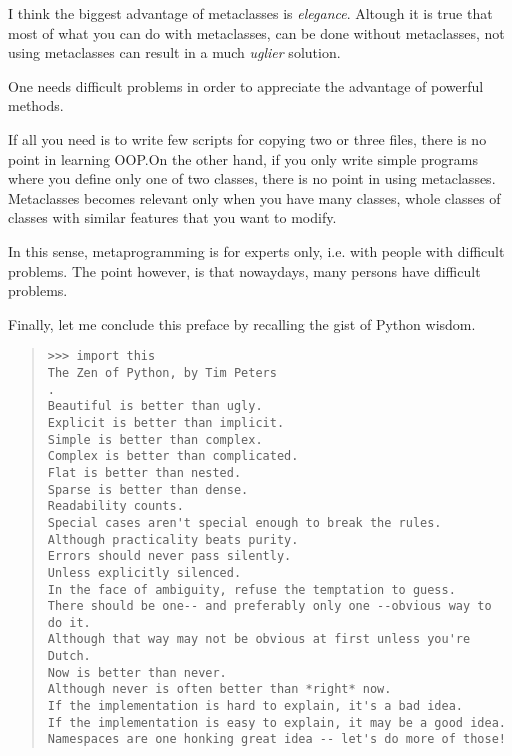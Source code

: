 \documentclass[11pt,english]{book}
\begin{document}
I think the biggest advantage of metaclasses is \emph{elegance}. Altough it
is true that most of what you can do with metaclasses, can be done without 
metaclasses, not using metaclasses can result in a much \emph{uglier} solution.

One needs difficult problems in order to appreciate the advantage
of powerful methods.

If all you need is to write few scripts for copying two or three files,
there is no point in learning OOP.On the other hand, if you only
write simple programs where you define only one of two classes, there
is no point in using metaclasses. Metaclasses becomes relevant only
when you have many classes, whole classes of classes with similar
features that you want to modify.

In this sense, metaprogramming is for experts only, i.e. with people
with difficult problems. The point however, is that nowaydays,
many persons have difficult problems.

Finally, let me conclude this preface by recalling the
gist of Python wisdom.
\begin{quote}
\begin{verbatim}>>> import this
The Zen of Python, by Tim Peters
.
Beautiful is better than ugly.
Explicit is better than implicit.
Simple is better than complex.
Complex is better than complicated.
Flat is better than nested.
Sparse is better than dense.
Readability counts.
Special cases aren't special enough to break the rules.
Although practicality beats purity.
Errors should never pass silently.
Unless explicitly silenced.
In the face of ambiguity, refuse the temptation to guess.
There should be one-- and preferably only one --obvious way to do it.
Although that way may not be obvious at first unless you're Dutch.
Now is better than never.
Although never is often better than *right* now.
If the implementation is hard to explain, it's a bad idea.
If the implementation is easy to explain, it may be a good idea.
Namespaces are one honking great idea -- let's do more of those!\end{verbatim}
\end{quote}
\end{document}
